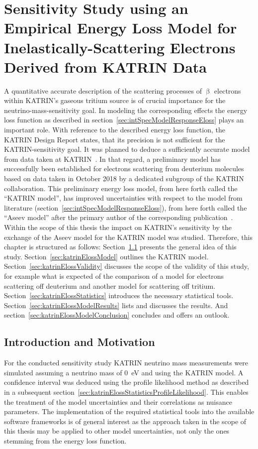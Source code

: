 \def\currentRootFolder{chapter/sensitivityStudyWithPreliminaryKatrinElossModel}
\def\currentFigureFolder{\currentRootFolder/fig}

\chapter{Sensitivity Study using an Empirical Energy Loss Model for Inelastically-Scattering Electrons Derived from KATRIN Data}
\label{sec:katrinEloss}
A quantitative accurate description of the scattering processes of $\upbeta$ electrons within KATRIN's gaseous tritium source is of crucial importance for the neutrino-mass-sensitivity goal. In modeling the corresponding effects the energy loss function as described in section~\ref{sec:intSpecModelResponseEloss} plays an important role. With reference to the described energy loss function, the KATRIN Design Report states, that its precision is not sufficient for the KATRIN-sensitivity goal. It was planned to deduce a sufficiently accurate model from data taken at KATRIN~\cite{Angrik:2005ep}. In that regard, a preliminary model has successfully been established for electrons scattering from deuterium molecules based on data taken in October 2018 by a dedicated subgroup of the KATRIN collaboration. This preliminary energy loss model, from here forth called the ``KATRIN model'', has improved uncertainties with respect to the model from literature (section~\ref{sec:intSpecModelResponseEloss}), from here forth called the ``Aseev model'' after the primary author of the corresponding publication~\cite{Aseev2000}. Within the scope of this thesis the impact on KATRIN's sensitivity by the exchange of the Aseev model for the KATRIN model was studied. Therefore, this chapter is structured as follows: Section~\ref{sec:katrinElossConcept} presents the general idea of this study. Section~\ref{sec:katrinElossModel} outlines the KATRIN model. Section~\ref{sec:katrinElossValidity} discusses the scope of the validity of this study, for example what is expected of the comparison of a model for electrons scattering off deuterium and another model for scattering off tritium. Section~\ref{sec:katrinElossStatistics} introduces the necessary statistical tools. Section~\ref{sec:katrinElossModelResults} lists and discusses the results. And section~\ref{sec:katrinElossModelConclusion} concludes and offers an outlook.

\section{Introduction and Motivation}
\label{sec:katrinElossConcept}
For the conducted sensitivity study KATRIN neutrino mass measurements were simulated assuming a neutrino mass of \SI{0}{eV} and using the KATRIN model. A confidence interval was deduced using the profile likelihood method as described in a subsequent section~\ref{sec:katrinElossStatisticsProfileLikelihood}. This enables the treatment of the model uncertainties and their correlations as nuisance parameters. The implementation of the required statistical tools into the available software frameworks is of general interest as the approach taken in the scope of this thesis may be applied to other model uncertainties, not only the ones stemming from the energy loss function.


